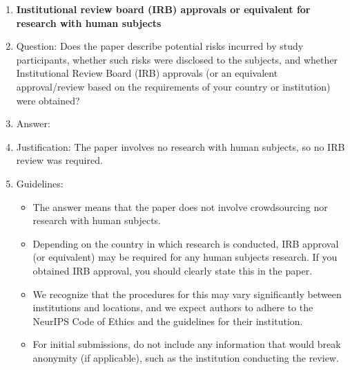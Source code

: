 \begin{enumerate}
\item {\bf Institutional review board (IRB) approvals or equivalent for research with human subjects}
    \item[] Question: Does the paper describe potential risks incurred by study participants, whether such risks were disclosed to the subjects, and whether Institutional Review Board (IRB) approvals (or an equivalent approval/review based on the requirements of your country or institution) were obtained?
    \item[] Answer: \answerNA{} %
    \item[] Justification: The paper involves no research with human subjects, so no IRB review was required.
    \item[] Guidelines:
    \begin{itemize}
        \item The answer \answerNA{} means that the paper does not involve crowdsourcing nor research with human subjects.
        \item Depending on the country in which research is conducted, IRB approval (or equivalent) may be required for any human subjects research. If you obtained IRB approval, you should clearly state this in the paper. 
        \item We recognize that the procedures for this may vary significantly between institutions and locations, and we expect authors to adhere to the NeurIPS Code of Ethics and the guidelines for their institution. 
        \item For initial submissions, do not include any information that would break anonymity (if applicable), such as the institution conducting the review.
    \end{itemize}


\end{enumerate}
